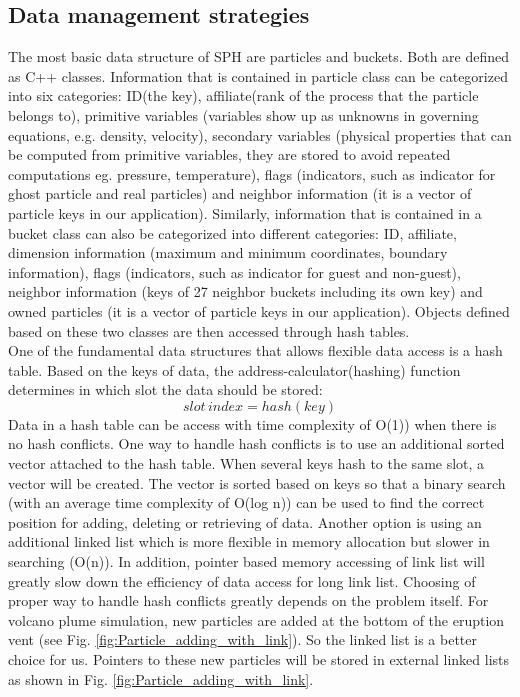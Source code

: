\documentclass[procedia]{easychair}
\begin{document}
\subsection{Data management strategies}
The most basic data structure of SPH are particles and buckets. Both are defined as C++ classes. Information that is contained in particle class can be categorized into six categories: ID(the key), affiliate(rank of the process that the particle belongs to), primitive variables (variables show up as unknowns in governing equations, e.g. density, velocity), secondary variables (physical properties that can be computed from primitive variables, they are stored to avoid repeated computations eg. pressure, temperature), flags (indicators, such as indicator for ghost particle and real particles) and neighbor information (it is a vector of particle keys in our application). Similarly,  information that is contained in  a bucket class can also be categorized into different categories: ID, affiliate, dimension information (maximum and minimum coordinates, boundary information), flags (indicators, such as indicator for guest and non-guest), neighbor information (keys of 27 neighbor buckets including its own key) and owned particles (it is a vector of particle keys in our application). Objects defined based on these two classes are then accessed through hash tables.\\
One of the fundamental data structures that allows flexible data access is a hash table. Based on the keys of data, the address-calculator(hashing) function determines in which slot the data should be stored:
\begin{equation}
slot\,index = hash(key)
\end{equation}
Data in a hash table can be access with time complexity of O(1)) when there is no hash conflicts. One way to handle hash conflicts is to use an additional sorted vector attached to the hash table. When several keys hash to the same slot, a vector will be created. The vector is sorted based on keys so that a binary search (with an average time complexity of O(log n)) can be used to find the correct position for adding, deleting or retrieving of data. Another option is using an additional linked list which is more flexible in memory allocation but slower in searching (O(n)). In addition, pointer based memory accessing of link list will greatly slow down the efficiency of data access for long link list. Choosing of proper way to handle hash conflicts greatly depends on the problem itself. For volcano plume simulation, new particles are added at the bottom of the eruption vent (see Fig. \ref{fig:Particle_adding_with_link}). So the linked list is a better choice for us. Pointers to these new particles will be stored in external linked lists as shown in Fig. \ref{fig:Particle_adding_with_link}.
\end{document}
